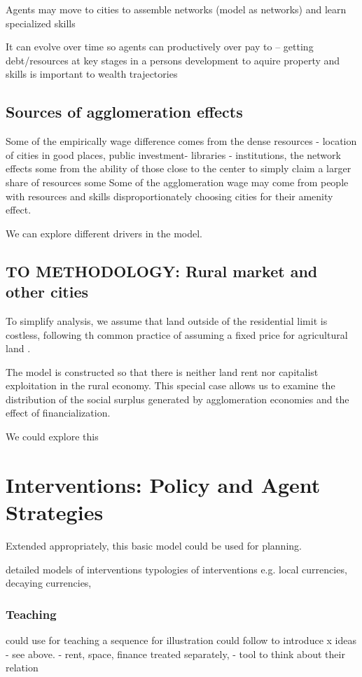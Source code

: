 Agents may move to cities to assemble networks (model as networks)
and learn specialized skills

It can evolve over time so agents can productively over pay to  
-- getting debt/resources at key stages in a persons development to aquire property and skills is important to \gls{wealth trajectories}


\subsection{Sources of agglomeration effects}
Some of the empirically wage difference comes from the dense resources  - location of cities in good places, public investment- libraries - institutions, the network effects
some from the ability of those close to the center to simply claim a larger share of resources
some 
Some of the agglomeration wage may come from people with resources and skills disproportionately choosing cities for their amenity effect. 

We can explore different drivers in the model.


\subsection{TO METHODOLOGY: Rural market and other cities}

 To simplify analysis, we assume that land outside of the residential limit is costless, following th common practice of assuming a fixed price for agricultural land \cite{GET_fixed-price-ag-land}. 

The model is constructed so that there is neither land rent nor capitalist exploitation in the rural economy. 
This special case allows us to examine the distribution of the social surplus generated by agglomeration economies and the effect of financialization.

We could explore this

\section{Interventions: Policy and Agent Strategies}
Extended appropriately, this basic model could be used for planning.

detailed models of interventions typologies of interventions e.g. local currencies, decaying currencies, 

\subsubsection{Teaching}
could use for teaching a sequence for illustration could follow to introduce x ideas - see above. - rent, space, finance treated separately, - tool to think about their relation

